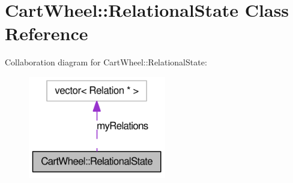 \hypertarget{classCartWheel_1_1RelationalState}{
\section{CartWheel::RelationalState Class Reference}
\label{classCartWheel_1_1RelationalState}
}


Collaboration diagram for CartWheel::RelationalState:\nopagebreak
\begin{figure}[H]
\begin{center}
\leavevmode
\includegraphics[width=170pt]{classCartWheel_1_1RelationalState__coll__graph}
\end{center}
\end{figure}
